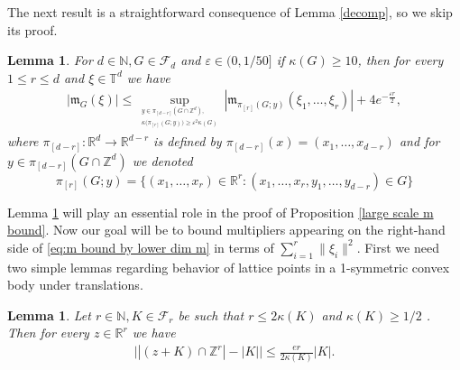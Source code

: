 \documentclass[a4paper,oneside, reqno]{amsart}
\numberwithin{equation}{section}
\newtheorem{Lem}[Thm]{Lemma}
\theoremstyle{definition}%
\theoremstyle{definition}
\theoremstyle{definition}%
\theoremstyle{definition}
\newcommand{\Z}{\mathbb{Z}}
\newcommand{\R}{\mathbb{R}}
\newcommand{\N}{\mathbb{N}}
\newcommand{\T}{\mathbb{T}}
\begin{document}
The next result is a straightforward consequence of Lemma \ref{decomp}, so we skip its proof.
\begin{Lem}
\label{m bound by lower dim m}
For $d\in\N, G \in \mathcal{F}_d$ and $\varepsilon\in(0, 1/50]$ if $\kappa(G)\ge 10$, then for every $1\le r\le d$ and $\xi\in\T^d$ we have
\begin{align}
  \label{eq:m bound by lower dim m}
  | \mathfrak{m}_G(\xi)|\le\sup_{_{\substack{y \in \pi_{[d-r]}(G \cap \Z^d), \\\kappa\big(\pi_{[r]}(G;y)\big) \ge \varepsilon^2 \kappa(G)}}}|
 \mathfrak{m}_{\pi_{[r]}(G;y)}(\xi_1,\ldots, \xi_r)|+4e^{-\frac{\varepsilon r}{2}},
\end{align}
where $\pi_{[d-r]}: \R^d \to \R^{d-r}$ is defined by $\pi_{[d-r]}(x)=(x_1, \ldots, x_{d-r})$ and for $y \in \pi_{[d-r]}(G \cap \Z^d)$ we denoted 
\[
\pi_{[r]}(G;y)=\Big\{ (x_1,\ldots, x_r) \in \R^r: (x_1,\ldots,x_r,y_1,\ldots,y_{d-r}) \in G \Big\}
\]
\end{Lem}
Lemma \ref{m bound by lower dim m} will play an essential role in the proof of Proposition \ref{large scale m bound}. Now our goal will be to bound multipliers appearing on the right-hand side of \eqref{eq:m bound by lower dim m} in terms of $\sum_{i=1}^r \|\xi_i \|^2$.
First we need two simple lemmas regarding behavior of lattice points in a 1-symmetric convex body under translations. 
\begin{Lem}
\label{low dim shift comp}
Let $r\in\N, K \in \mathcal{F}_r $ be  such that   $r\le 2\kappa(K)$ and $\kappa(K) \ge 1/2$ . Then for every $z\in\R^r$ we have
\begin{align}
  \label{eq:low dim shift comp}
  \big||(z+K)\cap\Z^r|-|K|\big|\le  \frac{e r}{2\kappa(K)} |K|.
\end{align}

\end{Lem}
\end{document}
